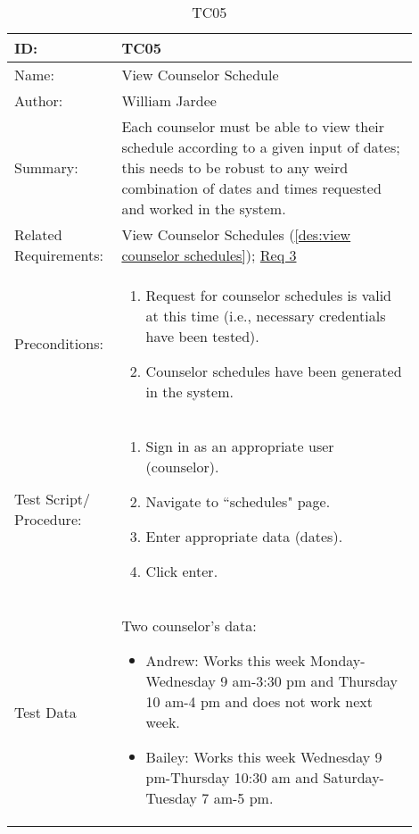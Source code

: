 \documentclass[11pt]{article}
\begin{document}
\begin{table}[H]
\begin{center}
\caption{TC05}
\label{TC05}
\begin{tabular}{p{0.20\linewidth}p{0.70\linewidth}}
	ID: & TC05\\\hline
	Name: & View Counselor Schedule \\\hline
	Author: & William Jardee\\\hline
	Summary: & Each counselor must be able to view their schedule according to a given input of dates; this needs to be robust to any weird combination of dates and times requested and worked in the system. \\\hline
	Related \hspace{5em} Requirements:& View Counselor Schedules (\cref{des:view counselor schedules}); \hyperlink{Req3}{Req 3}\\\hline
	Preconditions:& \begin{enumerate}[topsep=0pt]
		\item Request for counselor schedules is valid at this time (i.e., necessary credentials have been tested).
		\item Counselor schedules have been generated in the system. 
	\end{enumerate}\\\hline
	Test Script/ Procedure: & \begin{enumerate}[topsep=0pt]
		\item Sign in as an appropriate user (counselor).
		\item Navigate to ``schedules" page.
		\item Enter appropriate data (dates).
		\item Click enter.
	\end{enumerate}\\\hline
	Test Data & \vspace*{.25em} Two counselor's data:
	\begin{itemize}[topsep=0pt]
		\item Andrew: Works this week Monday-Wednesday 9 am-3:30 pm and Thursday 10 am-4 pm and does not work next week.
		\item Bailey: Works this week Wednesday 9 pm-Thursday 10:30 am and Saturday-Tuesday 7 am-5 pm.
	\end{itemize}
\end{tabular}
\end{center}
\end{table}
\end{document}
